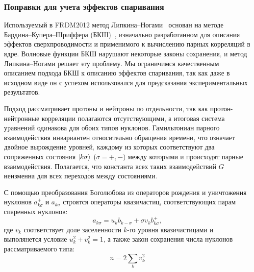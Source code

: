 \subsubsection{Поправки для учета эффектов спаривания}
Используемый в FRDM2012 метод Липкина--Ногами~\cite{lipkin1960, nogami1964} основан на методе Бардина--Купера--Шриффера (БКШ)~\cite{bcs1957}, изначально разработанном для описания эффектов сверхпроводимости и применимого к вычислению парных корреляций в ядре. Волновые функции БКШ нарушают некоторые законы сохранения, и метод Липкина--Ногами решает эту проблему. Мы ограничимся качественным описанием подхода БКШ к описанию эффектов спаривания, так как даже в исходном виде он с успехом использовался для предсказания экспериментальных результатов.

Подход рассматривает протоны и нейтроны по отдельности, так как протон-нейтронные корреляции полагаются отсутствующими, а итоговая система уравнений одинакова для обоих типов нуклонов. Гамильтониан парного взаимодействия инвариантен относительно обращения времени, что означает двойное вырождение уровней, каждому из которых соответствуют два сопряженных состояния $\ket{k\sigma}$ ($\sigma = +,-$) между которыми и происходят парные взаимодействия. Полагается, что константа всех таких взаимодействий $G$ неизменна для всех переходов между состояниями.

С помощью преобразования Боголюбова из операторов рождения и уничтожения нуклонов $a^+_{k\sigma}$ и $a_{k\sigma}$ строятся операторы квазичастиц, соответствующих парам спаренных нуклонов:
\begin{equation}
a_{k\sigma} = u_k b_{k -\sigma} + \sigma v_k b^+_{k\sigma},
\end{equation}
где $v_k$ соответствует доле заселенности $k$-го уровня квазичастицами и выполянется условие $u^2_k + v^2_k = 1$, а также закон сохранения числа нуклонов рассматриваемого типа:
\begin{equation}
n = 2\sum_k v_k^2
\end{equation}

